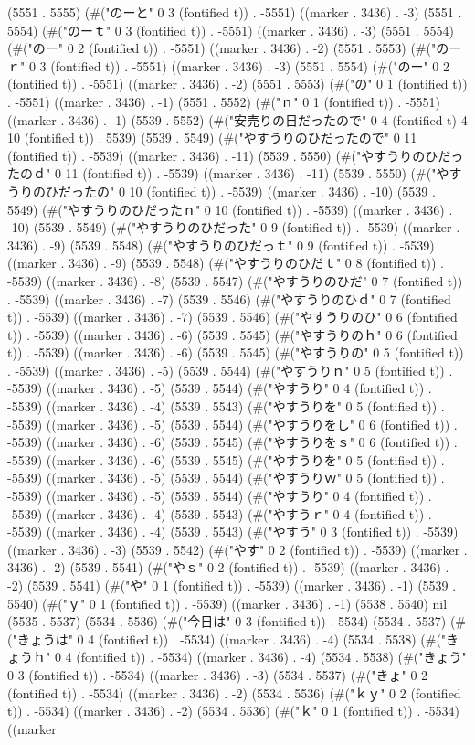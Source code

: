 (5551 . 5555) (#("のーと" 0 3 (fontified t)) . -5551) ((marker . 3436) . -3) (5551 . 5554) (#("のーｔ" 0 3 (fontified t)) . -5551) ((marker . 3436) . -3) (5551 . 5554) (#("のー" 0 2 (fontified t)) . -5551) ((marker . 3436) . -2) (5551 . 5553) (#("のーｒ" 0 3 (fontified t)) . -5551) ((marker . 3436) . -3) (5551 . 5554) (#("のー" 0 2 (fontified t)) . -5551) ((marker . 3436) . -2) (5551 . 5553) (#("の" 0 1 (fontified t)) . -5551) ((marker . 3436) . -1) (5551 . 5552) (#("ｎ" 0 1 (fontified t)) . -5551) ((marker . 3436) . -1) (5539 . 5552) (#("安売りの日だったので" 0 4 (fontified t) 4 10 (fontified t)) . 5539) (5539 . 5549) (#("やすうりのひだったので" 0 11 (fontified t)) . -5539) ((marker . 3436) . -11) (5539 . 5550) (#("やすうりのひだったのｄ" 0 11 (fontified t)) . -5539) ((marker . 3436) . -11) (5539 . 5550) (#("やすうりのひだったの" 0 10 (fontified t)) . -5539) ((marker . 3436) . -10) (5539 . 5549) (#("やすうりのひだったｎ" 0 10 (fontified t)) . -5539) ((marker . 3436) . -10) (5539 . 5549) (#("やすうりのひだった" 0 9 (fontified t)) . -5539) ((marker . 3436) . -9) (5539 . 5548) (#("やすうりのひだっｔ" 0 9 (fontified t)) . -5539) ((marker . 3436) . -9) (5539 . 5548) (#("やすうりのひだｔ" 0 8 (fontified t)) . -5539) ((marker . 3436) . -8) (5539 . 5547) (#("やすうりのひだ" 0 7 (fontified t)) . -5539) ((marker . 3436) . -7) (5539 . 5546) (#("やすうりのひｄ" 0 7 (fontified t)) . -5539) ((marker . 3436) . -7) (5539 . 5546) (#("やすうりのひ" 0 6 (fontified t)) . -5539) ((marker . 3436) . -6) (5539 . 5545) (#("やすうりのｈ" 0 6 (fontified t)) . -5539) ((marker . 3436) . -6) (5539 . 5545) (#("やすうりの" 0 5 (fontified t)) . -5539) ((marker . 3436) . -5) (5539 . 5544) (#("やすうりｎ" 0 5 (fontified t)) . -5539) ((marker . 3436) . -5) (5539 . 5544) (#("やすうり" 0 4 (fontified t)) . -5539) ((marker . 3436) . -4) (5539 . 5543) (#("やすうりを" 0 5 (fontified t)) . -5539) ((marker . 3436) . -5) (5539 . 5544) (#("やすうりをし" 0 6 (fontified t)) . -5539) ((marker . 3436) . -6) (5539 . 5545) (#("やすうりをｓ" 0 6 (fontified t)) . -5539) ((marker . 3436) . -6) (5539 . 5545) (#("やすうりを" 0 5 (fontified t)) . -5539) ((marker . 3436) . -5) (5539 . 5544) (#("やすうりｗ" 0 5 (fontified t)) . -5539) ((marker . 3436) . -5) (5539 . 5544) (#("やすうり" 0 4 (fontified t)) . -5539) ((marker . 3436) . -4) (5539 . 5543) (#("やすうｒ" 0 4 (fontified t)) . -5539) ((marker . 3436) . -4) (5539 . 5543) (#("やすう" 0 3 (fontified t)) . -5539) ((marker . 3436) . -3) (5539 . 5542) (#("やす" 0 2 (fontified t)) . -5539) ((marker . 3436) . -2) (5539 . 5541) (#("やｓ" 0 2 (fontified t)) . -5539) ((marker . 3436) . -2) (5539 . 5541) (#("や" 0 1 (fontified t)) . -5539) ((marker . 3436) . -1) (5539 . 5540) (#("ｙ" 0 1 (fontified t)) . -5539) ((marker . 3436) . -1) (5538 . 5540) nil (5535 . 5537) (5534 . 5536) (#("今日は" 0 3 (fontified t)) . 5534) (5534 . 5537) (#("きょうは" 0 4 (fontified t)) . -5534) ((marker . 3436) . -4) (5534 . 5538) (#("きょうｈ" 0 4 (fontified t)) . -5534) ((marker . 3436) . -4) (5534 . 5538) (#("きょう" 0 3 (fontified t)) . -5534) ((marker . 3436) . -3) (5534 . 5537) (#("きょ" 0 2 (fontified t)) . -5534) ((marker . 3436) . -2) (5534 . 5536) (#("ｋｙ" 0 2 (fontified t)) . -5534) ((marker . 3436) . -2) (5534 . 5536) (#("ｋ" 0 1 (fontified t)) . -5534) ((marker 